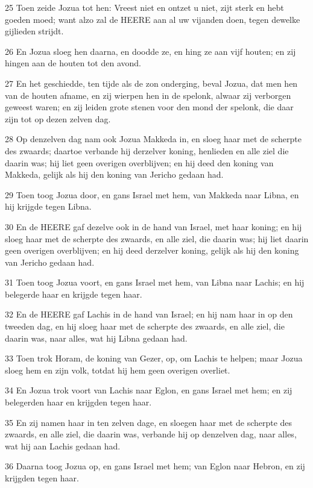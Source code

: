 \par 25 Toen zeide Jozua tot hen: Vreest niet en ontzet u niet, zijt sterk en hebt goeden moed; want alzo zal de HEERE aan al uw vijanden doen, tegen dewelke gijlieden strijdt.
\par 26 En Jozua sloeg hen daarna, en doodde ze, en hing ze aan vijf houten; en zij hingen aan de houten tot den avond.
\par 27 En het geschiedde, ten tijde als de zon onderging, beval Jozua, dat men hen van de houten afname, en zij wierpen hen in de spelonk, alwaar zij verborgen geweest waren; en zij leiden grote stenen voor den mond der spelonk, die daar zijn tot op dezen zelven dag.
\par 28 Op denzelven dag nam ook Jozua Makkeda in, en sloeg haar met de scherpte des zwaards; daartoe verbande hij derzelver koning, henlieden en alle ziel die daarin was; hij liet geen overigen overblijven; en hij deed den koning van Makkeda, gelijk als hij den koning van Jericho gedaan had.
\par 29 Toen toog Jozua door, en gans Israel met hem, van Makkeda naar Libna, en hij krijgde tegen Libna.
\par 30 En de HEERE gaf dezelve ook in de hand van Israel, met haar koning; en hij sloeg haar met de scherpte des zwaards, en alle ziel, die daarin was; hij liet daarin geen overigen overblijven; en hij deed derzelver koning, gelijk als hij den koning van Jericho gedaan had.
\par 31 Toen toog Jozua voort, en gans Israel met hem, van Libna naar Lachis; en hij belegerde haar en krijgde tegen haar.
\par 32 En de HEERE gaf Lachis in de hand van Israel; en hij nam haar in op den tweeden dag, en hij sloeg haar met de scherpte des zwaards, en alle ziel, die daarin was, naar alles, wat hij Libna gedaan had.
\par 33 Toen trok Horam, de koning van Gezer, op, om Lachis te helpen; maar Jozua sloeg hem en zijn volk, totdat hij hem geen overigen overliet.
\par 34 En Jozua trok voort van Lachis naar Eglon, en gans Israel met hem; en zij belegerden haar en krijgden tegen haar.
\par 35 En zij namen haar in ten zelven dage, en sloegen haar met de scherpte des zwaards, en alle ziel, die daarin was, verbande hij op denzelven dag, naar alles, wat hij aan Lachis gedaan had.
\par 36 Daarna toog Jozua op, en gans Israel met hem; van Eglon naar Hebron, en zij krijgden tegen haar.
